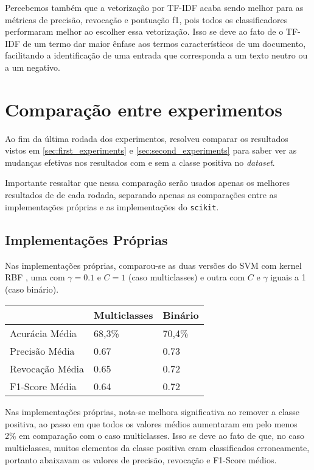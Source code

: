 Percebemos também que a vetorização por TF-IDF acaba sendo melhor para as métricas
de precisão, revocação e pontuação f1, pois todos os classificadores performaram
melhor ao escolher essa vetorização. Isso se deve ao fato de o TF-IDF de um termo
dar maior ênfase aos termos característicos de um documento, facilitando a identificação
de uma entrada que corresponda a um texto neutro ou a um negativo.

\section{Comparação entre experimentos}

Ao fim da última rodada dos experimentos, resolveu comparar os resultados vistos em 
\ref{sec:first_experiments} e \ref{sec:second_experiments} para saber ver as mudanças
efetivas nos resultados com e sem a classe positiva no \textit{dataset}.

Importante ressaltar que nessa comparação serão usados apenas os melhores resultados de
de cada rodada, separando apenas as comparações entre as implementações próprias
e as implementações do \texttt{scikit}.

\subsection{Implementações Próprias}

Nas implementações próprias, comparou-se as duas versões do SVM com kernel RBF
, uma com $\gamma = 0.1$ e $C = 1$ (caso multiclasses) e outra com $C$ e $\gamma$ iguais a 1 (caso 
binário).  

\begin{table}[H]
	\centering
	\begin{tabular}{l l l}
	& Multiclasses & Binário \\
	\hline
	Acurácia Média & 68,3\% & 70,4\% \\
	\hline
	Precisão Média & 0.67 & 0.73 \\
	\hline
	Revocação Média & 0.65 & 0.72 \\
	\hline
	F1-Score Média & 0.64 & 0.72 \\
	\hline
	\end{tabular}
\end{table}

Nas implementações próprias, nota-se melhora significativa ao remover a classe positiva, ao passo
em que todos os valores médios aumentaram em pelo menos 2\% em comparação com o caso multiclasses.
Isso se deve ao fato de que, no caso multiclasses, muitos elementos da classe positiva eram
classificados erroneamente, portanto abaixavam os valores de precisão, revocação e F1-Score médios.


